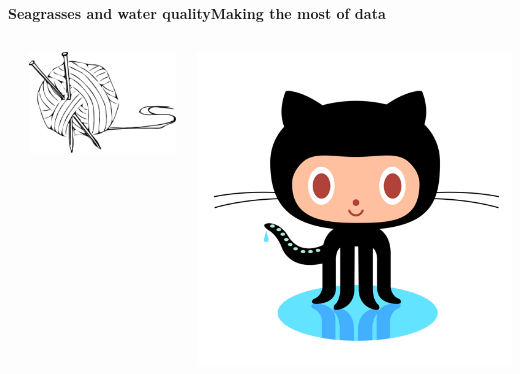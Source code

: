 \documentclass[serif]{beamer}\usepackage[]{graphicx}\usepackage[]{color}
\begin{document}
\begin{frame}{\textbf{Seagrasses and water quality}}{\textbf{Making the most of data}}
\begin{columns}
\begin{column}{0.2\textwidth}
\end{column}
\begin{column}{0.2\textwidth}
\centerline{\includegraphics[width = \textwidth]{fig/knit-logo.png}}
\end{column}
\begin{column}{0.2\textwidth}
\centerline{\includegraphics[width = \textwidth]{fig/octocat.png}}
\end{column}
\end{columns}
\end{frame}
\end{document}
